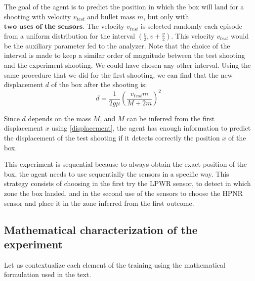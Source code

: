 \documentclass[11pt,a4paper,twoside]{report}
\newcommand{\+}{\textnormal{+} }
\theoremstyle{definition}
\numberwithin{equation}{chapter}
\begin{document}
The goal of the agent is to predict the position in which the box will land for
a shooting with velocity $v_{test}$ and bullet mass $m$, but only with
$\textbf{two uses of the sensors}$. The velocity $v_{test}$ is selected randomly
each episode from a uniform distribution for the interval $(\frac{v}{2},
v+\frac{v}{2})$. This velocity $v_{test}$ would be the auxiliary parameter fed
to the analyzer. Note that the choice of the interval is made to keep a similar
order of magnitude between the test shooting and the experiment shooting. We
could have chosen any other interval. Using the same procedure that we did for
the first shooting, we can find that the new displacement $d$ of the box after
the shooting is:
\begin{equation}
  d=\frac{1}{2g\mu}\left(\frac{v_{test}m}{M+2m} \right)^2
\end{equation}

Since $d$ depends on the mass $M$, and $M$ can be inferred from the first
displacement $x$ using \eqref{displacement}, the agent has enough information
to predict the displacement of the test shooting if it detects correctly the 
position $x$ of the box.

This experiment is sequential because to always obtain the exact position of the
box, the agent needs to use sequentially the sensors in a specific way. This
strategy consists of choosing in the first try the LPWR sensor, to detect in
which zone the box landed, and in the second use of the sensors to choose the
HPNR sensor and place it in the zone inferred from the first outcome.

\subsection{Mathematical characterization of the experiment}

Let us contextualize each element of the training using the mathematical
formulation used in the text.
\end{document}
